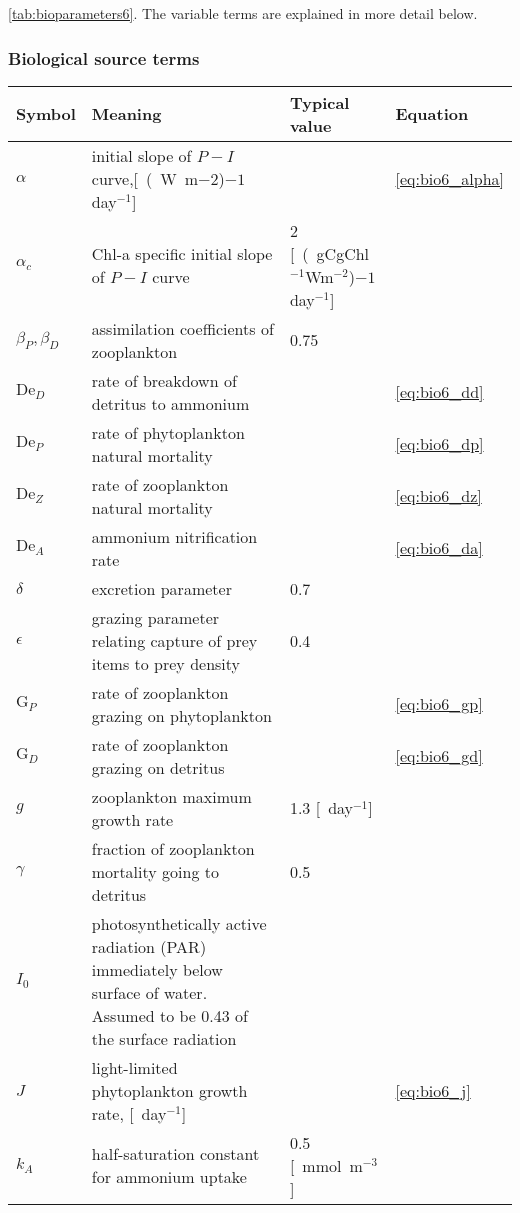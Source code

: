 \ref{tab:bioparameters6}. The variable terms are explained in more detail below.
\subsubsection{Biological source terms}

\begin{table}[ht]
  \centering
  \begin{tabular}{lp{8cm}p{5cm}l}\hline
    \textbf{Symbol} & \textbf{Meaning} & \textbf{Typical value} & \textbf{Equation}\\\hline
    $\alpha$ & initial slope of $P-I$ curve,\unit[(W m${-2}$)${-1}$ day$^{-1}$] && \eqref{eq:bio6_alpha} \\
    $\alpha_c$ & Chl-a specific initial slope of $P-I$ curve & 2 \unit[(gCgChl$^{-1}$Wm$^{-2}$)${-1}$day$^{-1}$] & \\
    $\beta_P, \beta_D$ & assimilation coefficients of zooplankton & 0.75 & \\
    $\mathrm{De}_D$ & rate of breakdown of detritus to ammonium && \eqref{eq:bio6_dd}\\
    $\mathrm{De}_P$ & rate of phytoplankton natural mortality && \eqref{eq:bio6_dp}\\
    $\mathrm{De}_Z$ & rate of zooplankton natural mortality && \eqref{eq:bio6_dz} \\
    $\mathrm{De}_A$ & ammonium nitrification rate && \eqref{eq:bio6_da} \\    
    $\delta$ & excretion parameter & 0.7 & \\
    $\epsilon$ & grazing parameter relating capture of prey items to prey density & 0.4 & \\
    $\mathrm{G}_P$ & rate of zooplankton grazing on phytoplankton && \eqref{eq:bio6_gp}\\
    $\mathrm{G}_D$ & rate of zooplankton grazing on detritus && \eqref{eq:bio6_gd}\\
    $g$ & zooplankton maximum growth rate & 1.3 \unit[day$^{-1}$] & \\
    $\gamma$ & fraction of zooplankton mortality going to detritus & 0.5 & \\
    $I_0$ & photosynthetically active radiation (PAR) immediately below surface of water. Assumed to be 0.43 of the surface radiation &  \\
    $J$ & light-limited phytoplankton growth rate, \unit[day$^{-1}$] && \eqref{eq:bio6_j}\\
    $k_A$ & half-saturation constant for ammonium uptake & 0.5 \unit[mmol m$^{-3}$]  & \\

\end{tabular}
\end{table}
